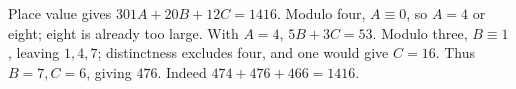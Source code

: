 Place value gives $301A+20B+12C=1416$. Modulo four, $A\equiv0$, so $A=4$ or eight; eight is already too large. With $A=4$, $5B+3C=53$. Modulo three, $B\equiv1$, leaving $1,4,7$; distinctness excludes four, and one would give $C=16$. Thus $B=7,C=6$, giving $\boxed{476}$. Indeed $474+476+466=1416$.
